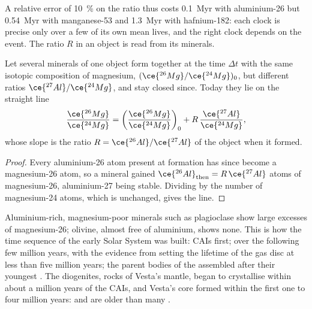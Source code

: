 A relative error of \qty{10}{\percent} on the ratio thus costs
\qty{0.1}{Myr} with aluminium-26 but \qty{0.54}{Myr} with manganese-53 and
\qty{1.3}{Myr} with hafnium-182: each clock is precise only over a few of its
own mean lives, and the right clock depends on the event. The ratio $R$ in an
object is read from its minerals.

\begin{proposition}
\label{prop:b2:planet-formation-meteorites:al-mg}
Let several minerals of one object form together at the time $\Delta t$ with the
same isotopic composition of magnesium, $(\ce{^{26}Mg}/\ce{^{24}Mg})_0$, but
different ratios $\ce{^{27}Al}/\ce{^{24}Mg}$, and stay closed since. Today they
lie on the straight line
\[
  \frac{\ce{^{26}Mg}}{\ce{^{24}Mg}}
  = \left(\frac{\ce{^{26}Mg}}{\ce{^{24}Mg}}\right)_0
  + R\,\frac{\ce{^{27}Al}}{\ce{^{24}Mg}},
\]
whose slope is the ratio $R = \ce{^{26}Al}/\ce{^{27}Al}$ of the object when it
formed.
\end{proposition}

\begin{proof}
Every aluminium-26 atom present at formation has since become a
magnesium-26 atom, so a mineral gained
$\ce{^{26}Al}_{\text{then}} = R\,\ce{^{27}Al}$ atoms of magnesium-26, aluminium-27
being stable. Dividing by the number of magnesium-24 atoms, which is unchanged,
gives the line.
\end{proof}

Aluminium-rich, magnesium-poor minerals such as plagioclase show large excesses
of magnesium-26; olivine, almost free of aluminium, shows none. This is how the
time sequence of the early Solar System was built: CAIs first;  over
the following few million years, with the evidence from  setting the
lifetime of the gas disc at less than five million years; the parent bodies of
the  assembled after their youngest . The diogenites,
rocks of Vesta's mantle, began to crystallise within about a million years of
the CAIs, and Vesta's core formed within the first one to
four million years:  and  are older than many
.

